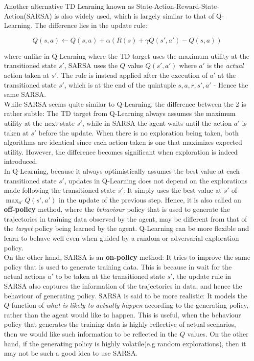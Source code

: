 \documentclass[11pt]{article}
\begin{document}
Another alternative TD Learning known as State-Action-Reward-State-Action(SARSA) is also widely used, which is largely similar to that of Q-Learning. The difference lies in the update rule:

$$
Q(s, a) \leftarrow Q(s, a) + \alpha(R(s) + \gamma Q(s', a') - Q(s, a))
$$

where unlike in Q-Learning where the TD target uses the maximum utility at the transitioned state $s'$, SARSA uses the $Q$ value $Q(s', a')$ where $a'$ is the \textit{actual} action taken at $s'$. The rule is instead applied after the execution of $a'$ at the transitioned state $s'$, which is at the end of the quintuple $s, a, r, s', a'$ - Hence the same SARSA.\\

While SARSA seems quite similar to Q-Learning, the difference between the 2 is rather subtle: The TD target from Q-Learning always assumes the maximum utility at the next state $s'$, while in SARSA the agent waits until the action $a'$ is taken at $s'$ before the update. When there is no exploration being taken, both algorithms are identical since each action taken is one that maximizes expected utility. However, the difference becomes significant when exploration is indeed introduced.\\

In Q-Learning, because it always optimistically assumes the best value at each transitioned state $s'$, updates in Q-Learning does not depend on the explorations made following the transitioned state $s'$: It simply uses the best value at $s'$ of $\max_{a'} Q(s', a')$ in the update of the previous step. Hence, it is also called an \textbf{off-policy} method, where the \textit{behaviour} policy that is used to generate the trajectories in training data observed by the agent, may be different from that of the \textit{target} policy being learned by the agent. Q-Learning can be more flexible and learn to behave well even when guided by a random or adversarial exploration policy.\\

On the other hand, SARSA is an \textbf{on-policy} method: It tries to improve the same policy that is used to generate training data. This is because in wait for the actual actions $a'$ to be taken at the transitioned state $s'$, the update rule in SARSA also captures the information of the trajectories in data, and hence the behaviour of generating policy. SARSA is said to be more realistic: It models the $Q$-function of \textit{what is likely to actually happen} according to the generating policy, rather than the agent would like to happen. This is useful, when the behaviour policy that generates the training data is highly reflective of actual scenarios, then we would like such information to be reflected in the $Q$ values. On the other hand, if the generating policy is highly volatile(e.g random explorations), then it may not be such a good idea to use SARSA.
\end{document}
